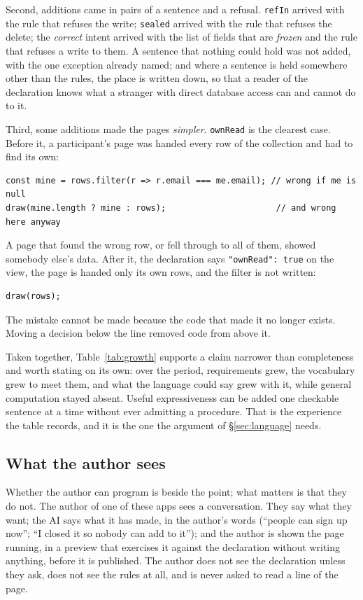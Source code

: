 \documentclass[11pt]{article}
\begin{document}
Second, additions came in pairs of a sentence and a refusal. \texttt{refIn} arrived with the rule that refuses the write; \texttt{sealed} arrived with the rule that refuses the delete; the \emph{correct} intent arrived with the list of fields that are \emph{frozen} and the rule that refuses a write to them. A sentence that nothing could hold was not added, with the one exception already named; and where a sentence is held somewhere other than the rules, the place is written down, so that a reader of the declaration knows what a stranger with direct database access can and cannot do to it.

Third, some additions made the pages \emph{simpler}. \texttt{ownRead} is the clearest case. Before it, a participant's page was handed every row of the collection and had to find its own:

\begin{lstlisting}
const mine = rows.filter(r => r.email === me.email); // wrong if me is null
draw(mine.length ? mine : rows);                      // and wrong here anyway
\end{lstlisting}

\noindent A page that found the wrong row, or fell through to all of them, showed somebody else's data. After it, the declaration says \texttt{"ownRead": true} on the view, the page is handed only its own rows, and the filter is not written:

\begin{lstlisting}
draw(rows);
\end{lstlisting}

\noindent The mistake cannot be made because the code that made it no longer exists. Moving a decision below the line removed code from above it.

Taken together, Table~\ref{tab:growth} supports a claim narrower than completeness and worth stating on its own: over the period, requirements grew, the vocabulary grew to meet them, and what the language could say grew with it, while general computation stayed absent. Useful expressiveness can be added one checkable sentence at a time without ever admitting a procedure. That is the experience the table records, and it is the one the argument of \S\ref{sec:language} needs.

\subsection{What the author sees}

Whether the author can program is beside the point; what matters is that they do not. The author of one of these apps sees a conversation. They say what they want; the AI says what it has made, in the author's words (``people can sign up now''; ``I closed it so nobody can add to it''); and the author is shown the page running, in a preview that exercises it against the declaration without writing anything, before it is published. The author does not see the declaration unless they ask, does not see the rules at all, and is never asked to read a line of the page.
\end{document}
